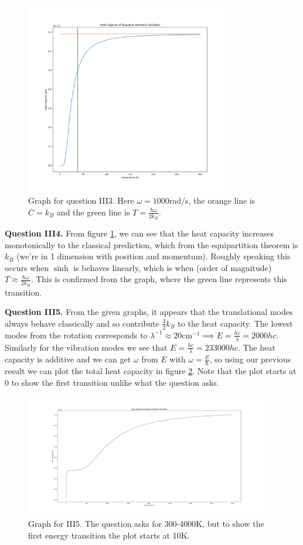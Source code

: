 \documentclass[letterpaper, reqno,11pt]{article}
\begin{document}
\begin{figure}[htpb]
    \centering
    \includegraphics[width=0.8\textwidth]{III3}
    \caption{Graph for question III3. Here $\omega=1000$rad/s, the orange line is $C=k_B$ and the green line is $T=\frac{\hbar\omega}{2k_B}$.}
    \label{fig:III3}
\end{figure}

{\medskip\noindent\bf Question III4.} From figure \ref{fig:III3}, we can see that the heat capacity increases monotonically to the classical prediction, which from the equipartition theorem is $k_B$ (we're in 1 dimension with position and momentum). Roughly speaking this occurs when $\sinh$ is behaves linearly, which is when (order of magnitude) $T\approx \frac{\hbar\omega}{2k_B}$. This is confirmed from the graph, where the green line represents this transition.

{\medskip\noindent\bf Question III5.} From the given graphs, it appears that the translational modes always behave classically and so contribute $\frac{3}{2}k_B$ to the heat capacity. The lowest modes from the rotation corresponds to $\lambda^{-1}\approx 20\text{cm}^{-1}\implies E=\frac{hc}{\lambda}=2000hc$. Similarly for the vibration modes we see that $E=\frac{hc}{\lambda}=233000hc$. The heat capacity is additive and we can get $\omega$ from $E$ with $\omega=\frac{E}{\hbar}$, so using our previous result we can plot the total heat capacity in figure \ref{fig:III5}. Note that the plot starts at 0 to show the first transition unlike what the question asks.

\begin{figure}[htpb]
  \centering
  \includegraphics[width=0.95\textwidth]{III5}
  \caption{Graph for III5. The question asks for 300-4000K, but to show the first energy transition the plot starts at 10K.}
  \label{fig:III5}
\end{figure}
\end{document}
